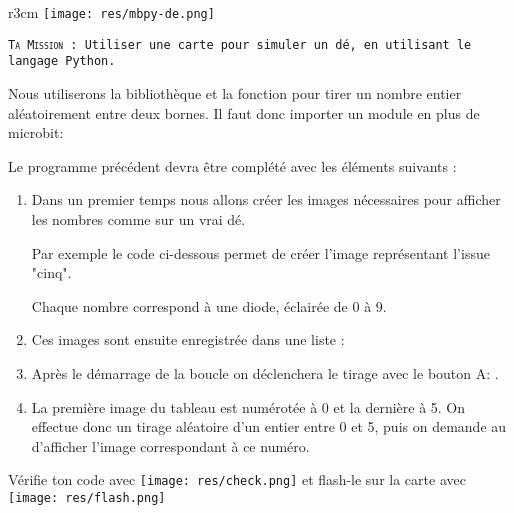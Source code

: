 \begin{wrapfigure}[5]{r}{3cm}
    \texttt{[image: res/mbpy-de.png]}
\end{wrapfigure}

\begin{eleve}    
    \texttt{\textsc{Ta Mission} : Utiliser une carte
    \mb  pour simuler un dé, en utilisant le langage Python.}

Nous utiliserons la bibliothèque  et la fonction  pour tirer un nombre entier aléatoirement entre deux bornes. Il faut donc importer un module en plus de microbit:
     
Le programme précédent devra être complété avec les éléments suivants :

    \begin{enumerate}
    \item Dans un premier temps nous allons créer les images nécessaires pour afficher les nombres comme sur un vrai dé.
    
    Par exemple le code ci-dessous permet de créer l'image représentant l'issue "cinq".
    
    Chaque nombre correspond à une diode, éclairée de 0 à 9.
    
    \item Ces images sont ensuite enregistrée dans une liste :
    
    \item Après le démarrage de la boucle  on déclenchera le tirage avec le bouton A:  .
    
    \item La première image du tableau  est numérotée à 0 et la dernière à 5.
    On effectue donc un tirage aléatoire d'un entier entre 0 et 5, puis on demande au \mb d'afficher l'image correspondant à ce numéro.
    
    
    \end{enumerate}
    
    Vérifie ton code avec   \texttt{[image: res/check.png]} et flash-le sur la carte avec \texttt{[image: res/flash.png]}

    

\end{eleve}



